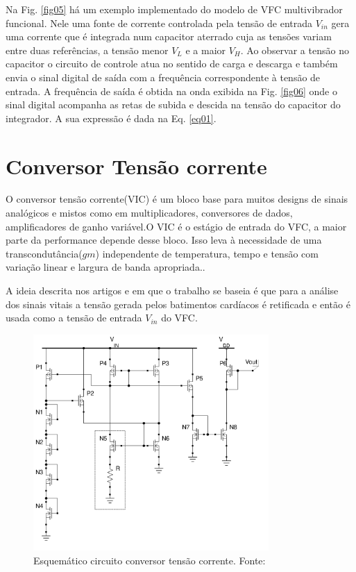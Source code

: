 Na Fig. \ref{fig05} há um exemplo implementado do modelo de VFC multivibrador funcional. Nele uma fonte de corrente controlada pela tensão de entrada $V_{in}$ gera uma corrente que é integrada num capacitor aterrado cuja as tensões variam entre duas referências, a tensão menor $V_L$ e a maior $V_H$. Ao observar a tensão no capacitor o circuito de controle atua no sentido de carga e descarga e também envia o sinal digital de saída com a frequência correspondente à tensão de entrada.  
A frequência de saída é obtida na onda exibida na Fig. \ref{fig06} onde o sinal digital acompanha as retas de subida e descida na tensão do capacitor do integrador. A sua expressão é dada na Eq. \ref{eq01}. 

\section{Conversor Tensão corrente} 

O conversor tensão corrente(VIC) é um bloco base para muitos designs de sinais analógicos e mistos como em multiplicadores, conversores de dados, amplificadores de ganho variável.O VIC é o estágio de entrada do VFC, a maior parte  da performance depende desse bloco. Isso leva à necessidade de uma transcondutância($gm$) independente de temperatura, tempo e tensão com variação linear e largura de banda apropriada.\cite{livroprincipal}.

A ideia descrita nos artigos \cite{artigo_principal} e \cite{artigo_tag_unb} em que o trabalho se baseia é que para a análise dos sinais vitais a tensão gerada pelos batimentos cardíacos é retificada e então é usada como a tensão de entrada $V_{in}$ do VFC. 

\begin{figure}[htb]
	\centering
	\includegraphics[width=0.8\textwidth]{figuras/v-i.png}
	\caption{Esquemático circuito conversor tensão corrente. Fonte:\cite{artigo_principal} }
	\label{fig07}
\end{figure}


